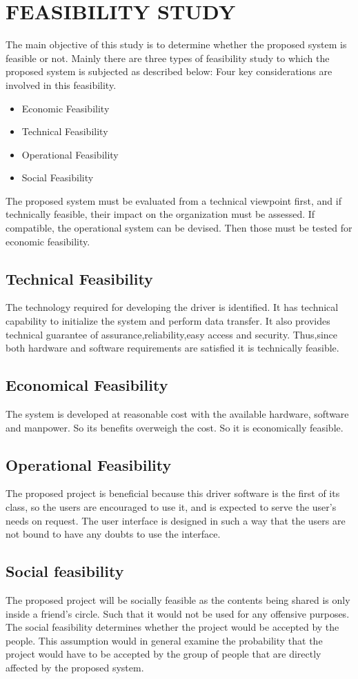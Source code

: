 \documentclass[12pt,a4paper,oneside]{report}
\begin{document}
\section{FEASIBILITY STUDY}
\par The main objective of this study is to determine whether the proposed system is feasible or not. Mainly there are three types of feasibility study to which the proposed system is subjected as described below: Four key considerations are involved in this feasibility.\\
\begin{itemize}
\item Economic Feasibility
\item Technical Feasibility
\item Operational Feasibility
\item Social Feasibility
\end{itemize}
The proposed system must be evaluated from a technical viewpoint ﬁrst, and if technically feasible, their impact on the organization must be assessed. If compatible, the operational system can be devised. Then those must be tested for economic feasibility.
\subsection{Technical Feasibility}
The technology required for developing the driver is identiﬁed. It has technical capability to initialize the system and perform data transfer. It also provides technical guarantee of assurance,reliability,easy access and security. Thus,since both hardware and software requirements are satisﬁed it is technically feasible.
\subsection{Economical Feasibility}
The system is developed at reasonable cost with the available hardware, software and manpower. So its beneﬁts overweigh the cost. So it is economically feasible.
\subsection{Operational Feasibility}
The proposed project is beneﬁcial because this driver software is the ﬁrst of its class, so the users are encouraged to use it, and is expected to serve the user’s needs on request. The user interface is designed in such a way that the users are not bound to have any doubts to use the interface.
\subsection{Social feasibility}
The proposed project will be socially feasible as the contents being shared is only inside a friend’s circle. Such that it would not be used for any offensive purposes. The social feasibility determines whether the project would be accepted by the people. This assumption would in general examine the probability that the project would have to be accepted by the group of people that are directly affected by the proposed system.
\end{document}
